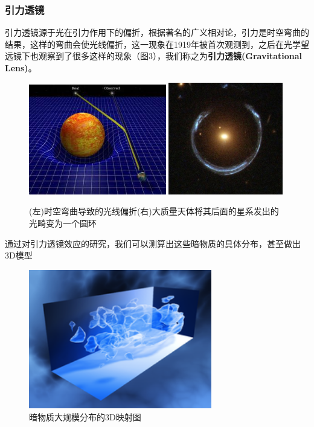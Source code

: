 \documentclass[UTF8]{ctexart}
\begin{document}
\subsubsection{引力透镜}
引力透镜源于光在引力作用下的偏折，根据著名的广义相对论，引力是时空弯曲的结果，这样的弯曲会使光线偏折，这一现象在1919年被首次观测到，之后在光学望远镜下也观察到了很多这样的现象（图3），我们称之为\textbf{引力透镜(Gravitational Lens)}。
\begin{figure}[H]
    \centering
    \includegraphics[width=6cm]{cf7afb5a65d8442d71a7c7db51836b04.jpg}
    \includegraphics[width=5cm]{db70e090804d296d47be7aef28127faa.jpg}
    \caption{(左)时空弯曲导致的光线偏折(右)大质量天体将其后面的星系发出的光畸变为一个圆环}
    \label{fig:my_label}
\end{figure}


通过对引力透镜效应的研究，我们可以测算出这些暗物质的具体分布，甚至做出3D模型
\begin{figure}[H]
    \centering
    \includegraphics[width=8cm]{220px-COSMOS_3D_dark_matter_map(1).png}
    \caption{暗物质大规模分布的3D映射图}
    \label{fig:my_label}
\end{figure}
\end{document}

